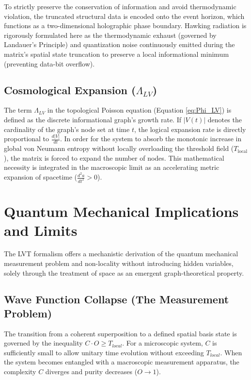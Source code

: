 \documentclass[12pt,a4paper]{article}
\begin{document}
To strictly preserve the conservation of information and avoid thermodynamic violation, the truncated structural data is encoded onto the event horizon, which functions as a two-dimensional holographic phase boundary. Hawking radiation is rigorously formulated here as the thermodynamic exhaust (governed by Landauer's Principle) and quantization noise continuously emitted during the matrix's spatial state truncation to preserve a local informational minimum (preventing data-bit overflow).


\subsection{Cosmological Expansion ($\Lambda_{LV}$)}
The term $\Lambda_{LV}$ in the topological Poisson equation (Equation \ref{eq:Phi_LV}) is defined as the discrete informational graph's growth rate. If $|V(t)|$ denotes the cardinality of the graph's node set at time $t$, the logical expansion rate is directly proportional to $\frac{d|V|}{dt}$. In order for the system to absorb the monotonic increase in global von Neumann entropy without locally overloading the threshold field ($T_{\mathrm{local}}$), the matrix is forced to expand the number of nodes. This mathematical necessity is integrated in the macroscopic limit as an accelerating metric expansion of spacetime ($\frac{d^2a}{dt^2} > 0$).

\section{Quantum Mechanical Implications and Limits}

The LVT formalism offers a mechanistic derivation of the quantum mechanical measurement problem and non-locality without introducing hidden variables, solely through the treatment of space as an emergent graph-theoretical property.

\subsection{Wave Function Collapse (The Measurement Problem)}

The transition from a coherent superposition to a defined spatial basis state is governed by the inequality $C \cdot O \ge T_{local}$. For a microscopic system, $C$ is sufficiently small to allow unitary time evolution without exceeding $T_{local}$. When the system becomes entangled with a macroscopic measurement apparatus, the complexity $C$ diverges and purity decreases ($O \rightarrow 1$). 
\end{document}
